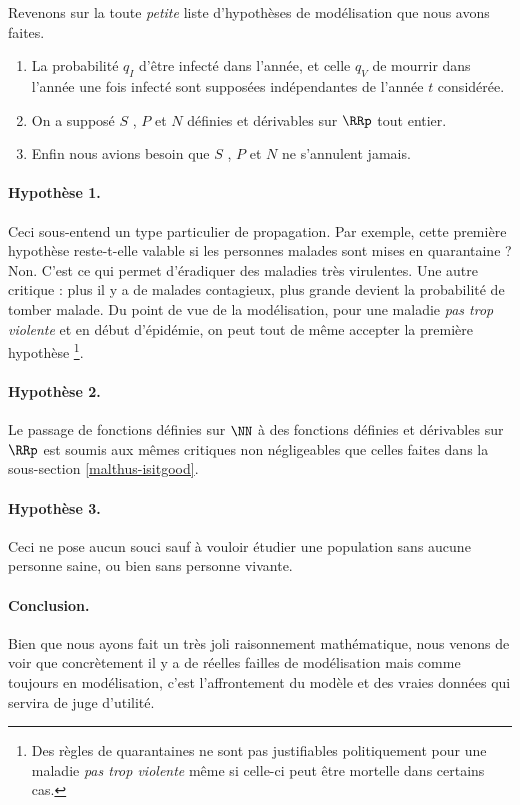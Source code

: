 Revenons sur la toute \emph{\og petite \fg} liste d'hypothèses de modélisation que nous avons faites.

\begin{enumerate}
	\item La probabilité $q_I$ d'être infecté dans l'année, et celle $q_V$ de mourrir dans l'année une fois infecté sont supposées indépendantes de l'année $t$ considérée.

	\item On a supposé $S$ , $P$ et $N$ définies et dérivables sur $\RRp$ tout entier.

	\item Enfin nous avions besoin que $S$ , $P$ et $N$ ne s'annulent jamais.
\end{enumerate}




\paragraph{Hypothèse 1.} Ceci sous-entend un type particulier de propagation.
Par exemple, cette première hypothèse reste-t-elle valable si les personnes malades sont mises en quarantaine ? Non. C'est ce qui permet d'éradiquer des maladies très virulentes.
Une autre critique : plus il y a de malades contagieux, plus grande devient la probabilité de tomber malade. 
Du point de vue de la modélisation, pour une maladie \emph{\og pas trop violente \fg} et en début d'épidémie, on peut tout de même accepter la première hypothèse
\footnote{
	Des règles de quarantaines ne sont pas justifiables politiquement pour une maladie \emph{\og pas trop violente \fg} même si celle-ci peut être mortelle dans certains cas.
}.




\paragraph{Hypothèse 2.} Le passage de fonctions définies sur $\NN$ à des fonctions définies et dérivables sur $\RRp$ est soumis aux mêmes critiques non négligeables que celles faites dans la sous-section \ref{malthus-isitgood}.




\paragraph{Hypothèse 3.} Ceci ne pose aucun souci sauf à vouloir étudier une population sans aucune personne saine, ou bien sans personne vivante.




\paragraph{Conclusion.} Bien que nous ayons fait un très joli raisonnement mathématique, nous venons de voir que concrètement il y a de réelles failles de modélisation mais comme toujours en modélisation, c'est l'affrontement du modèle et des vraies données qui servira de juge d'utilité.